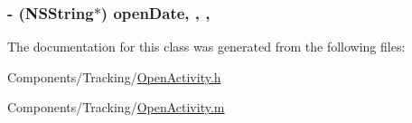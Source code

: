 \hypertarget{interface_open_activity_a9ae34102bd0a2cd1c285dea922ae1aba}{
\subsubsection[{open\-Date}]{\setlength{\rightskip}{0pt plus 5cm}-\/ (N\-S\-String$\ast$) open\-Date\hspace{0.3cm}{\ttfamily [read]}, {\ttfamily [write]}, {\ttfamily [nonatomic]}, {\ttfamily [strong]}}}\label{interface_open_activity_a9ae34102bd0a2cd1c285dea922ae1aba}


The documentation for this class was generated from the following files\-:\begin{DoxyCompactItemize}
\item 
Components/\-Tracking/\hyperlink{_open_activity_8h}{Open\-Activity.\-h}\item 
Components/\-Tracking/\hyperlink{_open_activity_8m}{Open\-Activity.\-m}\end{DoxyCompactItemize}
